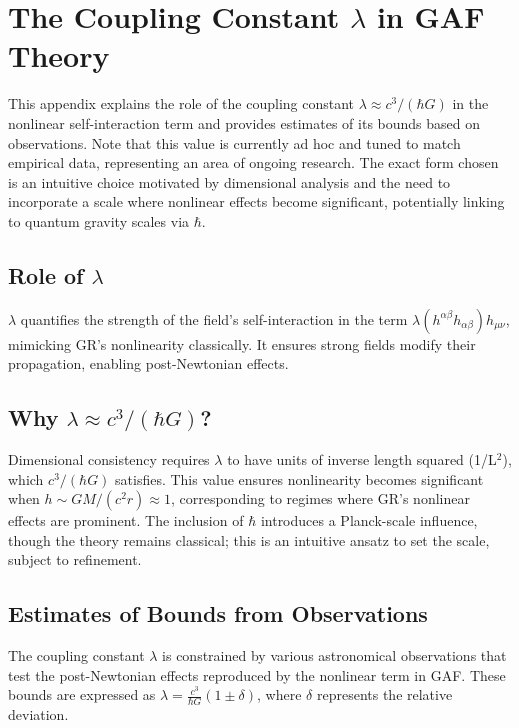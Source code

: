 \documentclass{article}
\begin{document}
\appendix

\section{The Coupling Constant \(\lambda\) in GAF Theory}

This appendix explains the role of the coupling constant \(\lambda \approx c^3 / (\hbar G)\) in the nonlinear self-interaction term and provides estimates of its bounds based on observations. Note that this value is currently ad hoc and tuned to match empirical data, representing an area of ongoing research. The exact form chosen is an intuitive choice motivated by dimensional analysis and the need to incorporate a scale where nonlinear effects become significant, potentially linking to quantum gravity scales via \(\hbar\).

\subsection{Role of \(\lambda\)}

\(\lambda\) quantifies the strength of the field's self-interaction in the term \(\lambda (h^{\alpha\beta} h_{\alpha\beta}) h_{\mu\nu}\), mimicking GR's nonlinearity classically. It ensures strong fields modify their propagation, enabling post-Newtonian effects.

\subsection{Why \(\lambda \approx c^3 / (\hbar G)\)?}

Dimensional consistency requires \(\lambda\) to have units of inverse length squared (1/L$^2$), which \(c^3 / (\hbar G)\) satisfies. This value ensures nonlinearity becomes significant when \(h \sim GM/(c^2 r) \approx 1\), corresponding to regimes where GR's nonlinear effects are prominent. The inclusion of \(\hbar\) introduces a Planck-scale influence, though the theory remains classical; this is an intuitive ansatz to set the scale, subject to refinement.

\subsection{Estimates of Bounds from Observations}

The coupling constant \(\lambda\) is constrained by various astronomical observations that test the post-Newtonian effects reproduced by the nonlinear term in GAF. These bounds are expressed as \(\lambda = \frac{c^3}{\hbar G} (1 \pm \delta)\), where \(\delta\) represents the relative deviation.
\end{document}
